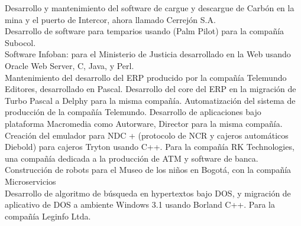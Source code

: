 \begin{entrylist}
    {Desarrollo y mantenimiento del software de cargue y descargue de Carbón en la mina y el puerto de Intercor, ahora llamado Cerrejón S.A.\\
     Desarrollo de software para temparios usando (Palm Pilot) para la compañía Subocol.\\
     Software Infoban: para el Ministerio de Justicia desarrollado en la Web  usando Oracle Web Server, C, Java, y Perl.\\
     Mantenimiento del desarrollo del ERP producido por la compañía Telemundo Editores, desarrollado en Pascal. Desarrollo
     del core del ERP en la migración de Turbo Pascal a Delphy para la misma compañía. Automatización del sistema de
     producción de la compañía Telemundo. Desarrollo de aplicaciones bajo plataforma Macromedia como Autorware,
     Director para la misma compañía.\\
     Creación del emulador para NDC + (protocolo de NCR y cajeros automáticos Diebold) para cajeros Tryton usando C++.
     Para la compañía RK Technologies, una compañía dedicada a la producción de ATM y software de banca.\\
     Construcción de robots para el Museo de los niños en Bogotá, con la compañía Microservicios\\
     Desarrollo de algoritmo de búsqueda en hypertextos bajo DOS, y migración de aplicativo de DOS a
     ambiente Windows 3.1 usando Borland C++. Para la compañía Leginfo Ltda.}
\end{entrylist}

